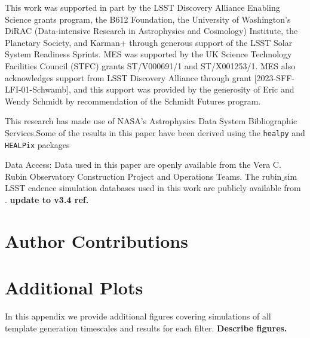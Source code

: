 \documentclass[preprint,linenumbers]{aastex631}
\begin{document}
{		\begin{acknowledgments}
			
			This work was supported in part by the LSST Discovery Alliance Enabling Science grants program, the B612 Foundation, the University of Washington's DiRAC (Data-intensive Research in Astrophysics and Cosmology) Institute, the Planetary Society, and Karman+ through generous support of the LSST Solar System Readiness Sprints. MES was supported by the UK Science Technology Facilities Council (STFC) grants ST/V000691/1 and ST/X001253/1. MES also acknowledges support from LSST Discovery Alliance through grant [2023-SFF-LFI-01-Schwamb], and this support was provided by the generosity of Eric and Wendy Schmidt by recommendation of the Schmidt Futures program.
			
			This research has made use of NASA's Astrophysics Data System Bibliographic Services.Some of the results in this paper have been derived using the \texttt{healpy} and \texttt{HEALPix} packages
			
			Data Access:  Data used in this paper are openly available from the Vera C. Rubin Observatory Construction Project and Operations Teams. The rubin$\_$sim LSST cadence simulation databases used in this work are publicly available from \cite{v3.4sims}. \textbf{update to v3.4 ref.}
			
		\end{acknowledgments}
		
		
		
		\section*{Author Contributions}
		
		\appendix
		\section{Additional Plots}
		\label{appendix:A}
		
		In this appendix we provide additional figures covering simulations of all template generation timescales and results for each filter.
		\textbf{Describe figures.}
		
}
\end{document}

